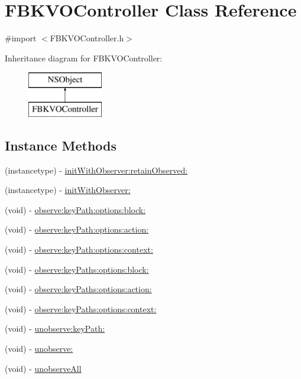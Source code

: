 \hypertarget{interface_f_b_k_v_o_controller}{\section{F\+B\+K\+V\+O\+Controller Class Reference}
\label{interface_f_b_k_v_o_controller}
}


{\ttfamily \#import $<$F\+B\+K\+V\+O\+Controller.\+h$>$}

Inheritance diagram for F\+B\+K\+V\+O\+Controller\+:\begin{figure}[H]
\begin{center}
\leavevmode
\includegraphics[height=2.000000cm]{interface_f_b_k_v_o_controller}
\end{center}
\end{figure}
\subsection*{Instance Methods}
\begin{DoxyCompactItemize}
\item 
(instancetype) -\/ \hyperlink{interface_f_b_k_v_o_controller_a05cd680b0b60c3765bfa6a52e1c97451}{init\+With\+Observer\+:retain\+Observed\+:}
\item 
(instancetype) -\/ \hyperlink{interface_f_b_k_v_o_controller_a9ac80858d344554e28a426c37f20d1c4}{init\+With\+Observer\+:}
\item 
(void) -\/ \hyperlink{interface_f_b_k_v_o_controller_a5e947c609b39d2e05dbf9e9e0639d1d4}{observe\+:key\+Path\+:options\+:block\+:}
\item 
(void) -\/ \hyperlink{interface_f_b_k_v_o_controller_a4558dee863033be98d3d59a16621edee}{observe\+:key\+Path\+:options\+:action\+:}
\item 
(void) -\/ \hyperlink{interface_f_b_k_v_o_controller_a09c725ec7fa8e649b3a1c2e5ecd004ae}{observe\+:key\+Path\+:options\+:context\+:}
\item 
(void) -\/ \hyperlink{interface_f_b_k_v_o_controller_a78b2d28e3b4bc208053a8d53c596f394}{observe\+:key\+Paths\+:options\+:block\+:}
\item 
(void) -\/ \hyperlink{interface_f_b_k_v_o_controller_a95f73613e406f372bf34906f56e89f4d}{observe\+:key\+Paths\+:options\+:action\+:}
\item 
(void) -\/ \hyperlink{interface_f_b_k_v_o_controller_a322a647907eebd55c01d185622e7ad39}{observe\+:key\+Paths\+:options\+:context\+:}
\item 
(void) -\/ \hyperlink{interface_f_b_k_v_o_controller_aebaeb37fe373939c8254984bdf3c518a}{unobserve\+:key\+Path\+:}
\item 
(void) -\/ \hyperlink{interface_f_b_k_v_o_controller_ac3ee7b99624a51d7ae3fadeb8adf7823}{unobserve\+:}
\item 
(void) -\/ \hyperlink{interface_f_b_k_v_o_controller_a68986621c451e29b46b6b8eda62e188e}{unobserve\+All}
\end{DoxyCompactItemize}
